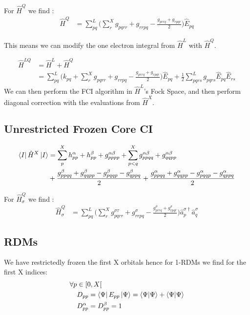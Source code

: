 For $\hat{{H}}^{Q}$ we find :
\begin{align}
   \hat{{H}}^{Q}  &= \sum_{pq}^L \Big(\sum^{X}_r g_{pqrr} + g_{rrpq} - \frac{g_{prrq} + g_{rpqr}}{2}  \Big)  \hat{E}_{pq}
\end{align}

This means we can modify the one electron integral from $\hat{{H}}^{L}$ with $\hat{{H}}^{Q}$.

\begin{align}
   \hat{{H}}^{LQ}  &=  \hat{{H}}^{L} + \hat{{H}}^{Q} \\
                  &=  \sum_{pq}^L \Big(k_{pq} + \sum^{X}_r g_{pqrr} + g_{rrpq} - \frac{g_{prrq} + g_{rpqr}}{2} \Big) \hat{E}_{pq} + \frac{1}{2} \sum_{pqrs}^L g_{pqrs} \hat{E}_{pq} \hat{E}_{rs}
\end{align}
We can then perform the FCI algorithm in $\hat{{H}}^{L}$'s Fock Space, and then perform diagonal correction with the evaluations from $\hat{{H}}^{X}$.


\subsection{Unrestricted Frozen Core CI}
  \begin{align}
    \bra{I} \hat{{H}}^{X} \ket{I} &= \sum^{X}_{p} h_{pp}^\alpha +  h_{pp}^\beta + g_{pppp}^{\alpha \beta} + \sum^{X}_{p<q} g_{ppqq}^{\alpha \beta} + g_{qqpp}^{\alpha \beta} \\
    &+ \frac{g_{ppqq}^\beta + g_{qqpp}^\beta  - g_{pqqp}^\beta - g_{qppq}^\beta }{2} + \frac{g_{ppqq}^\alpha + g_{qqpp}^\alpha - g_{pqqp}^\alpha - g_{qppq}^\alpha }{2}
   \end{align}

   For $\hat{{H}}^{Q}_\sigma$ we find :
   \begin{align}
      \hat{{H}}^{Q}_\sigma  &= \sum_{pq}^L \Big(\sum^{X}_r g_{pqrr}^{\sigma \tau} + g_{rrpq}^{\sigma} - \frac{g_{prrq}^{\sigma} + g_{rpqr}^{\sigma}}{2}  \Big)  \hat{a}^{\sigma \dagger}_p \hat{a}^{\sigma}_q 
   \end{align}

\subsection{RDMs}

We have restrictedly frozen the first X orbitals hence for 1-RDMs we find for the first X indices:
\begin{align}
  \forall p &\in [0,X[ \\
  & D_{pp} = \bra{\Psi} E_{pp} \ket{\Psi} = \braket{\Psi}{\Psi} + \braket{\Psi}{\Psi} \\
  & D_{pp}^\alpha = D_{pp}^\beta = 1
\end{align}

